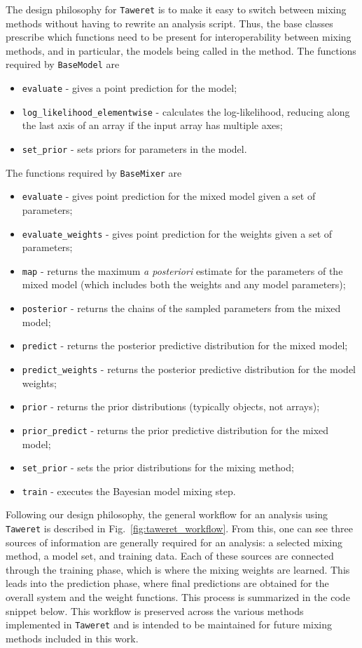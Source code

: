 \documentclass[10pt, preprint,aps,prc,floatfix,
tightenlines,
nofootinbib,superscriptaddress]{revtex4-2}
\begin{document}
The design philosophy for \texttt{Taweret} is to make it easy to switch between mixing methods without having to rewrite an analysis script.
Thus, the base classes prescribe which functions need to be present for interoperability between mixing methods, and in particular, the models being called in the method.
The functions required by \texttt{BaseModel} are 
\begin{itemize}[nosep]
    \item \texttt{evaluate} - gives a point prediction for the model;
    \item \texttt{log\_likelihood\_elementwise} - calculates the log-likelihood, reducing along the last axis of an array if the input array has multiple axes;
    \item \texttt{set\_prior} - sets priors for parameters in the model.
\end{itemize}
The functions required by \texttt{BaseMixer} are
\begin{itemize}[nosep]
    \item \texttt{evaluate} - gives point prediction for the mixed model given a set of parameters;
    \item \texttt{evaluate\_weights} - gives point prediction for the weights given a set of parameters;
    \item \texttt{map} - returns the maximum \textit{a posteriori} estimate for the parameters of the mixed model (which includes both the weights and any model parameters);
    \item \texttt{posterior} - returns the chains of the sampled parameters from the mixed model;
    \item \texttt{predict} - returns the posterior predictive distribution for the mixed model;
    \item \texttt{predict\_weights} - returns the posterior predictive distribution for the model weights;
    \item \texttt{prior} - returns the prior distributions (typically objects, not arrays);
    \item \texttt{prior\_predict} - returns the prior predictive distribution for the mixed model;
    \item \texttt{set\_prior} - sets the prior distributions for the mixing method;
    \item \texttt{train} - executes the Bayesian model mixing step.
\end{itemize}

Following our design philosophy, the general workflow for an analysis using \texttt{Taweret} is described in Fig.~\ref{fig:taweret_workflow}. From this, one can see three sources of information are generally required for an analysis: a selected mixing method, a model set, and training data. Each of these sources are connected through the training phase, which is where the mixing weights are learned. This leads into the prediction phase, where final predictions are obtained for the overall system and the weight functions. This process is summarized in the code snippet below. This workflow is preserved across the various methods implemented in \texttt{Taweret} and is intended to be maintained for future mixing methods included in this work.
\end{document}
